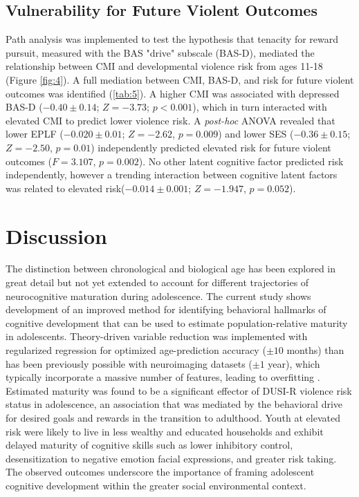 \documentclass[utf8]{stylesheet}
\begin{document}
\subsection{Vulnerability for Future Violent Outcomes} Path analysis was implemented to test the hypothesis that tenacity for reward pursuit, measured with the BAS "drive" subscale (BAS-D), mediated the relationship between CMI and developmental violence risk from ages 11-18 (Figure \ref{fig:4}). A full mediation between CMI, BAS-D, and risk for future violent outcomes was identified (\ref{tab:5}). A higher CMI was associated with depressed BAS-D ($-0.40\pm0.14$; $Z=-3.73$; $p<0.001$), which in turn interacted with elevated CMI to predict lower violence risk. A \textit{post-hoc} ANOVA revealed that lower EPLF ($-0.020\pm0.01$; $Z=-2.62$, $p=0.009$) and lower SES ($-0.36\pm0.15$; $Z=-2.50$, $p=0.01$) independently predicted elevated risk for future violent outcomes ($F=3.107$, $p=0.002$). No other latent cognitive factor predicted risk independently, however a trending interaction between cognitive latent factors was related to elevated risk($-0.014\pm0.001$; $Z=-1.947$,  $p=0.052$).
\\
\section{Discussion} The distinction between chronological and biological age has been explored in great detail but not yet extended to account for different trajectories of neurocognitive maturation during adolescence. The current study shows development of an improved method for identifying behavioral hallmarks of cognitive development that can be used to estimate population-relative maturity in adolescents. Theory-driven variable reduction was implemented with regularized regression for optimized age-prediction accuracy ($\pm 10$ months) than has been previously possible with neuroimaging datasets ($\pm1$ year), which typically incorporate a massive number of features, leading to overfitting \citep{cole2017predicting, franke2012brain}. Estimated maturity was found to be a significant effector of DUSI-R violence risk status in adolescence, an association that was mediated by the behavioral drive for desired goals and rewards in the transition to adulthood. Youth at elevated risk were likely to live in less wealthy and educated households and exhibit delayed maturity of cognitive skills such as lower inhibitory control, desensitization to negative emotion facial expressions, and greater risk taking. The observed outcomes underscore the importance of framing adolescent cognitive development within the greater social environmental context.
\vspace{4pt}
\end{document}
